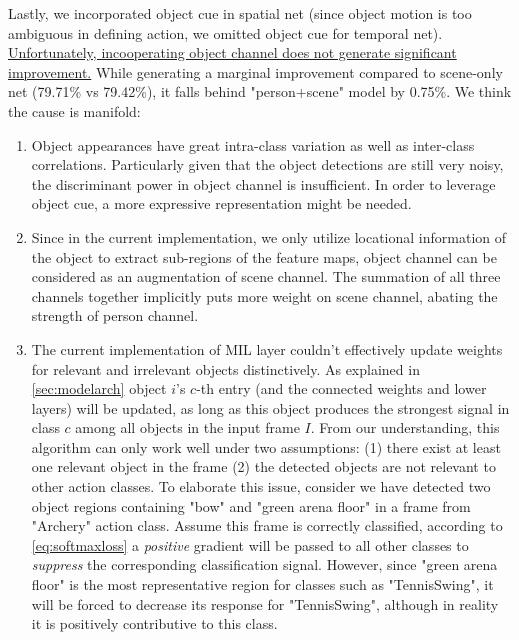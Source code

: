 Lastly, we incorporated object cue in spatial net (since object motion is too ambiguous in defining action, we omitted object cue for temporal net). 
\ul{Unfortunately, incooperating object channel does not generate significant improvement.}
While generating a marginal improvement compared to scene-only net (79.71\% vs 79.42\%), it falls behind "person+scene" model by 0.75\%.
We think the cause is manifold:
\begin{enumerate}
\item Object appearances have great intra-class variation as well as inter-class correlations.
Particularly given that the object detections are still very noisy, the discriminant power in object channel is insufficient.
In order to leverage object cue, a more expressive representation might be needed.
\item Since in the current implementation, we only utilize locational information of the object to extract sub-regions of the feature maps, object channel can be considered as an augmentation of scene channel.
The summation of all three channels together implicitly puts more weight on scene channel, abating the strength of person channel.
\item The current implementation of MIL layer couldn't effectively update weights for relevant and irrelevant objects distinctively. As explained in \autoref{sec:modelarch} object $ i $'s $ c $-th entry (and the connected weights and lower layers) will be updated, as long as this object produces the strongest signal in class $ c $ among all objects in the input frame $ I $.
From our understanding, this algorithm can only work well under two assumptions: (1) there exist at least one relevant object in the frame (2) the detected objects are not relevant to other action classes.
To elaborate this issue, consider we have detected two object regions containing "bow" and "green arena floor" in a frame from "Archery" action class.
Assume this frame is correctly classified, according to \autoref{eq:softmaxloss} a \textit{positive} gradient will be passed to all other classes to \textit{suppress} the corresponding classification signal.
However, since "green arena floor" is the most representative region for classes such as "TennisSwing", it will be forced to decrease its response for "TennisSwing", although in reality it is positively contributive to this class.
\end{enumerate}
